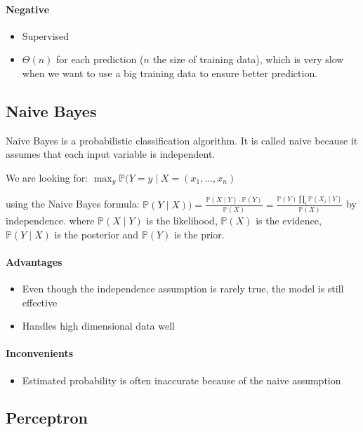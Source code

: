 \documentclass{article}
\begin{document}
\paragraph{Negative} \begin{itemize}
  \item Supervised
  \item $\Theta(n)$ for each prediction ($n$ the size of training data), which is
  very slow when we want to use a big training data to ensure better prediction.
\end{itemize}

\subsection{Naive Bayes}

Naive Bayes is a probabilistic classification algorithm.
It is called naive because it assumes that each input variable is independent.

We are looking for: $ \max_{y}\mathbb{P}(Y =y \mid X=(x_1, ..., x_n) $

using the Naive Bayes formula: $\mathbb{P}(Y \mid X)) = \frac{\mathbb{P}(X\mid Y)\cdot \mathbb{P}(Y)}{\mathbb{P}(X)} = \frac{\mathbb{P}(Y)\prod_{i}^{}\mathbb{P}(X_i\mid Y)}{\mathbb{P}(X)}$
by independence.
where $\mathbb{P}(X\mid Y)$ is the likelihood, $\mathbb{P}(X)$ is the evidence, $\mathbb{P}(Y \mid X)$ is the posterior and $\mathbb{P}(Y)$ is the prior.


\paragraph{Advantages} \begin{itemize}
\item Even though the independence assumption is rarely true, the model is still effective
\item Handles high dimensional data well
\end{itemize}

\paragraph{Inconvenients} \begin{itemize}
\item Estimated probability is often inaccurate because of the naive assumption
\end{itemize}
\subsection{Perceptron}
\end{document}
